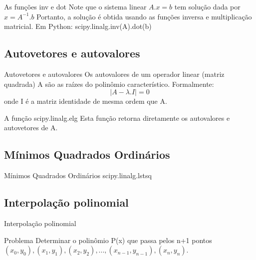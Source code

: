 \documentclass{beamer}
\begin{document}
	\begin{frame}{As funções inv e dot}
		Note que o sistema linear \begin{math}
			A.x = b
		\end{math}
		tem solução dada por \begin{math}
			x = A^{-1}.b
		\end{math}
		Portanto, a solução é obtida usando as funções inversa e multiplicação matricial.  Em Python: scipy.linalg.inv(A).dot(b)
	\end{frame}
	
	\subsection{Autovetores e autovalores}	
	\begin{frame}{Autovetores e autovalores}
		Os autovalores de um operador linear (matriz quadrada) A são as raízes do polinômio característico.  Formalmente:
		\begin{equation*}
			|A - \lambda.I| = 0
		\end{equation*}
		onde I é a matriz identidade de mesma ordem que A.
		
		\begin{block}{A função scipy.linalg.elg}
			Esta função retorna diretamente os autovalores e autovetores de A.
		\end{block}
		
	\end{frame}
	
		\subsection{Mínimos Quadrados Ordinários}
	
	\begin{frame}{Mínimos Quadrados Ordinários}
		scipy.linalg.lstsq
	\end{frame}
	
	\subsection{Interpolação polinomial}
	
	\begin{frame}{Interpolação polinomial}
		\begin{block}{Problema}
			Determinar o polinômio P(x) que passa pelos n+1 pontos $(x_0,y_0), (x_1,y_1), (x_2,y_2), ..., (x_{n-1},y_{n-1}), (x_n,y_n)$.
		\end{block}
	\end{frame}
	
\end{document}
